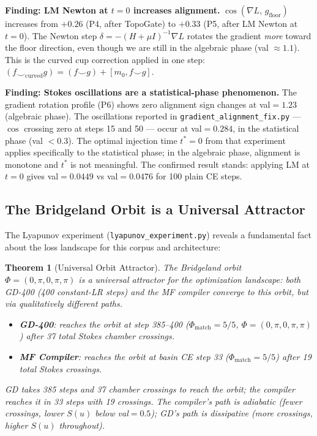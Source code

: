 \documentclass[11pt]{amsart}
\newtheorem{theorem}{Theorem}[section]
\begin{document}
\textbf{Finding: LM Newton at $t=0$ increases alignment.}
$\cos(\nabla L,\, g_\mathrm{floor})$ increases from $+0.26$ (P4, after TopoGate)
to $+0.33$ (P5, after LM Newton at $t=0$).
The Newton step $\delta = -(H+\mu I)^{-1}\nabla L$
rotates the gradient \emph{more} toward the floor direction,
even though we are still in the algebraic phase (val $\approx 1.1$).
This is the curved cup correction applied in one step:
$(f \smile_\mathrm{curved} g) = (f \smile g) + [m_0, f \smile g]$.

\textbf{Finding: Stokes oscillations are a statistical-phase phenomenon.}
The gradient rotation profile (P6) shows zero alignment sign changes
at val$= 1.23$ (algebraic phase).
The oscillations reported in \texttt{gradient\_alignment\_fix.py}
--- $\cos$ crossing zero at steps 15 and 50 --- occur at val$=0.284$,
in the statistical phase (val $< 0.3$).
The optimal injection time $t^*=0$ from that experiment
applies specifically to the statistical phase; in the algebraic phase,
alignment is monotone and $t^*$ is not meaningful.
The confirmed result stands: applying LM at $t=0$ gives
val$=0.0449$ vs val$=0.0476$ for 100 plain CE steps.

\subsection{The Bridgeland Orbit is a Universal Attractor}
\label{sec:orbit-attractor}

The Lyapunov experiment (\texttt{lyapunov\_experiment.py}) reveals
a fundamental fact about the loss landscape for this corpus and architecture:

\begin{theorem}[Universal Orbit Attractor]
\label{thm:orbit}
The Bridgeland orbit $\Phi = (0,\pi,0,\pi,\pi)$
is a universal attractor for the optimization landscape:
both GD-400 (400 constant-LR steps) and the MF compiler
converge to this orbit, but via qualitatively different paths.

\begin{itemize}
\item \textbf{GD-400}: reaches the orbit at step 385--400
  ($\Phi_\mathrm{match}=5/5$, $\Phi=(0,\pi,0,\pi,\pi)$)
  after 37 total Stokes chamber crossings.
\item \textbf{MF Compiler}: reaches the orbit at basin CE step 33
  ($\Phi_\mathrm{match}=5/5$) after 19 total Stokes crossings.
\end{itemize}
GD takes 385 steps and 37 chamber crossings to reach the orbit;
the compiler reaches it in 33 steps with 19 crossings.
The compiler's path is adiabatic (fewer crossings, lower $S(u)$ below val$=0.5$);
GD's path is dissipative (more crossings, higher $S(u)$ throughout).
\end{theorem}
\end{document}
